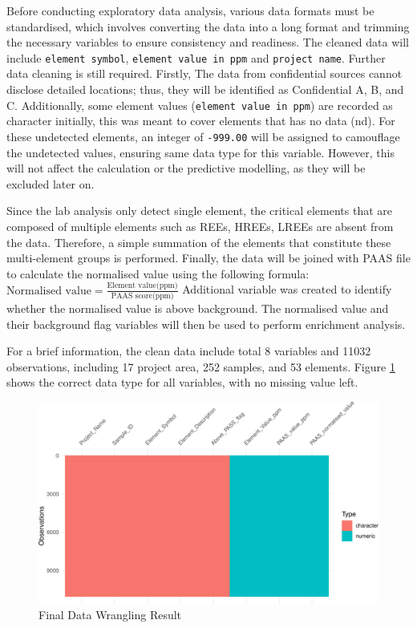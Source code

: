 \documentclass[11pt,a4paper,]{article}
\begin{document}
Before conducting exploratory data analysis, various data formats must be standardised, which involves converting the data into a long format and trimming the necessary variables to ensure consistency and readiness. The cleaned data will include \texttt{element\ symbol}, \texttt{element\ value\ in\ ppm} and \texttt{project\ name}. Further data cleaning is still required. Firstly, The data from confidential sources cannot disclose detailed locations; thus, they will be identified as Confidential A, B, and C. Additionally, some element values (\texttt{element\ value\ in\ ppm}) are recorded as character initially, this was meant to cover elements that has no data (nd). For these undetected elements, an integer of \texttt{-999.00} will be assigned to camouflage the undetected values, ensuring same data type for this variable. However, this will not affect the calculation or the predictive modelling, as they will be excluded later on.

Since the lab analysis only detect single element, the critical elements that are composed of multiple elements such as REEs, HREEs, LREEs are absent from the data. Therefore, a simple summation of the elements that constitute these multi-element groups is performed. Finally, the data will be joined with PAAS file to calculate the normalised value using the following formula:
\(\text{Normalised value}= \frac{\text{Element value(ppm)}}{\text{PAAS score(ppm)}}\)
Additional variable was created to identify whether the normalised value is above background. The normalised value and their background flag variables will then be used to perform enrichment analysis.

For a brief information, the clean data include total 8 variables and 11032 observations, including 17 project area, 252 samples, and 53 elements. Figure \ref{fig:visdat} shows the correct data type for all variables, with no missing value left.

\begin{figure}
\centering
\includegraphics{Final_report_files/figure-latex/visdat-1.pdf}
\caption{\label{fig:visdat}Final Data Wrangling Result}
\end{figure}
\end{document}
